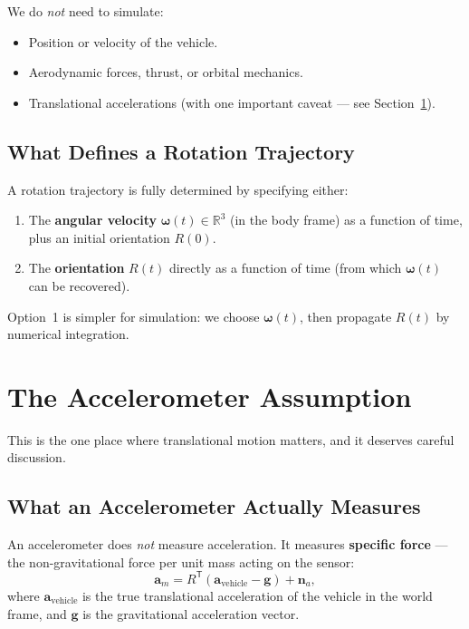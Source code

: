 \documentclass[11pt,letterpaper]{article}
\newcommand{\R}{\mathbb{R}}
\begin{document}
We do \emph{not} need to simulate:
\begin{itemize}[nosep]
  \item Position or velocity of the vehicle.
  \item Aerodynamic forces, thrust, or orbital mechanics.
  \item Translational accelerations (with one important caveat ---
    see Section~\ref{sec:accel_assumption}).
\end{itemize}

\subsection{What Defines a Rotation Trajectory}

A rotation trajectory is fully determined by specifying either:
\begin{enumerate}[nosep]
  \item The \textbf{angular velocity} $\bm{\omega}(t) \in \R^{3}$
    (in the body frame) as a function of time, plus an initial
    orientation $R(0)$.
  \item The \textbf{orientation} $R(t)$ directly as a function of
    time (from which $\bm{\omega}(t)$ can be recovered).
\end{enumerate}

Option~1 is simpler for simulation: we choose $\bm{\omega}(t)$,
then propagate $R(t)$ by numerical integration.

\section{The Accelerometer Assumption}
\label{sec:accel_assumption}

This is the one place where translational motion matters, and it
deserves careful discussion.

\subsection{What an Accelerometer Actually Measures}

An accelerometer does \emph{not} measure acceleration.  It measures
\textbf{specific force} --- the non-gravitational force per unit
mass acting on the sensor:
\[
  \mathbf{a}_m = R^{\mathsf{T}} (\mathbf{a}_{\mathrm{vehicle}} - \mathbf{g})
    + \mathbf{n}_{a},
\]
where $\mathbf{a}_{\mathrm{vehicle}}$ is the true translational
acceleration of the vehicle in the world frame, and $\mathbf{g}$
is the gravitational acceleration vector.
\end{document}
